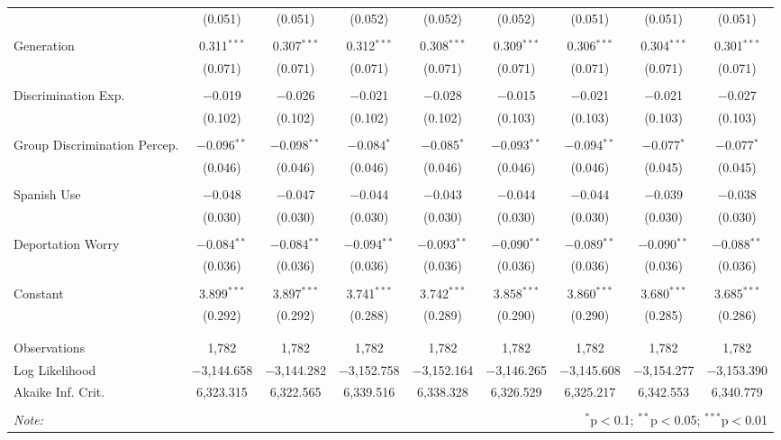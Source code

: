 \begin{table}[!htbp]
\begin{tabular}{@{\extracolsep{5pt}}lcccccccc}
  & (0.051) & (0.051) & (0.052) & (0.052) & (0.052) & (0.051) & (0.051) & (0.051) \\ 
  & & & & & & & & \\ 
 Generation & 0.311$^{***}$ & 0.307$^{***}$ & 0.312$^{***}$ & 0.308$^{***}$ & 0.309$^{***}$ & 0.306$^{***}$ & 0.304$^{***}$ & 0.301$^{***}$ \\ 
  & (0.071) & (0.071) & (0.071) & (0.071) & (0.071) & (0.071) & (0.071) & (0.071) \\ 
  & & & & & & & & \\ 
 Discrimination Exp. & $-$0.019 & $-$0.026 & $-$0.021 & $-$0.028 & $-$0.015 & $-$0.021 & $-$0.021 & $-$0.027 \\ 
  & (0.102) & (0.102) & (0.102) & (0.102) & (0.103) & (0.103) & (0.103) & (0.103) \\ 
  & & & & & & & & \\ 
 Group Discrimination Percep. & $-$0.096$^{**}$ & $-$0.098$^{**}$ & $-$0.084$^{*}$ & $-$0.085$^{*}$ & $-$0.093$^{**}$ & $-$0.094$^{**}$ & $-$0.077$^{*}$ & $-$0.077$^{*}$ \\ 
  & (0.046) & (0.046) & (0.046) & (0.046) & (0.046) & (0.046) & (0.045) & (0.045) \\ 
  & & & & & & & & \\ 
 Spanish Use & $-$0.048 & $-$0.047 & $-$0.044 & $-$0.043 & $-$0.044 & $-$0.044 & $-$0.039 & $-$0.038 \\ 
  & (0.030) & (0.030) & (0.030) & (0.030) & (0.030) & (0.030) & (0.030) & (0.030) \\ 
  & & & & & & & & \\ 
 Deportation Worry & $-$0.084$^{**}$ & $-$0.084$^{**}$ & $-$0.094$^{**}$ & $-$0.093$^{**}$ & $-$0.090$^{**}$ & $-$0.089$^{**}$ & $-$0.090$^{**}$ & $-$0.088$^{**}$ \\ 
  & (0.036) & (0.036) & (0.036) & (0.036) & (0.036) & (0.036) & (0.036) & (0.036) \\ 
  & & & & & & & & \\ 
 Constant & 3.899$^{***}$ & 3.897$^{***}$ & 3.741$^{***}$ & 3.742$^{***}$ & 3.858$^{***}$ & 3.860$^{***}$ & 3.680$^{***}$ & 3.685$^{***}$ \\ 
  & (0.292) & (0.292) & (0.288) & (0.289) & (0.290) & (0.290) & (0.285) & (0.286) \\ 
  & & & & & & & & \\ 
\hline \\[-1.8ex] 
Observations & 1,782 & 1,782 & 1,782 & 1,782 & 1,782 & 1,782 & 1,782 & 1,782 \\ 
Log Likelihood & $-$3,144.658 & $-$3,144.282 & $-$3,152.758 & $-$3,152.164 & $-$3,146.265 & $-$3,145.608 & $-$3,154.277 & $-$3,153.390 \\ 
Akaike Inf. Crit. & 6,323.315 & 6,322.565 & 6,339.516 & 6,338.328 & 6,326.529 & 6,325.217 & 6,342.553 & 6,340.779 \\ 
\hline 
\hline \\[-1.8ex] 
\textit{Note:}  & \multicolumn{8}{r}{$^{*}$p$<$0.1; $^{**}$p$<$0.05; $^{***}$p$<$0.01} \\ 
\end{tabular} 
\end{table} 
